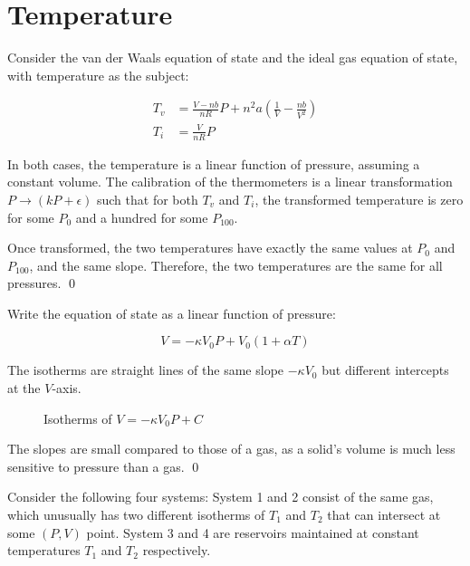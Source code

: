 \documentclass[12pt]{article}
\begin{document}
\pagebreak
\section*{Temperature}


Consider the van der Waals equation of state and the ideal gas equation of state, with temperature as the subject:

\begin{equation}
    \begin{split}
        T_{v} &= \frac{V - nb}{nR} P + n^{2}a \left( \frac{1}{V} - \frac{nb}{V^{2}} \right) \\
        T_{i} &= \frac{V}{nR} P
    \end{split}
\end{equation}

In both cases, the temperature is a linear function of pressure, assuming a constant volume. The calibration of the thermometers is a linear transformation $P \to (kP + \epsilon)$ such that for both $T_{v}$ and $T_{i}$, the transformed temperature is zero for some $P_{0}$ and a hundred for some $P_{100}$.

Once transformed, the two temperatures have exactly the same values at $P_{0}$ and $P_{100}$, and the same slope. Therefore, the two temperatures are the same for all pressures.
\qed


Write the equation of state as a linear function of pressure:

\begin{equation}
    V = -\kappa V_{0} P + V_{0} (1 + \alpha T)
\end{equation}

The isotherms are straight lines of the same slope $-\kappa V_{0}$ but different intercepts at the $V$-axis.


\begin{figure}[h]
    \centering
    
    \caption{Isotherms of $V = -\kappa V_{0} P + C$}
\end{figure}

The slopes are small compared to those of a gas, as a solid's volume is much less sensitive to pressure than a gas.
\qed


Consider the following four systems: System 1 and 2 consist of the same gas, which unusually has two different isotherms of $T_{1}$ and $T_{2}$ that can intersect at some $(P, V)$ point. System 3 and 4 are reservoirs maintained at constant temperatures $T_{1}$ and $T_{2}$ respectively.
\end{document}
